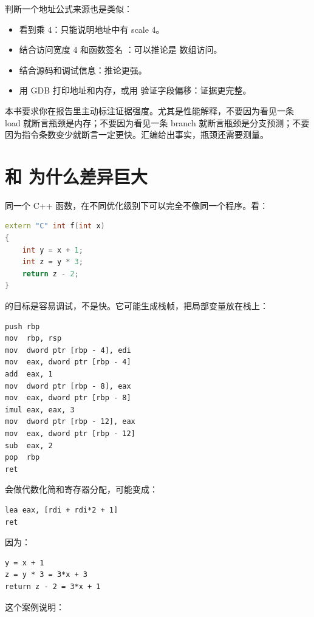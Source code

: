 判断一个地址公式来源也是类似：

\begin{itemize}
  \item 看到乘 4：只能说明地址中有 scale 4。
  \item 结合访问宽度 4 和函数签名 ：可以推论是  数组访问。
  \item 结合源码和调试信息：推论更强。
  \item 用 GDB 打印地址和内存，或用  验证字段偏移：证据更完整。
\end{itemize}

本书要求你在报告里主动标注证据强度。尤其是性能解释，不要因为看见一条 load 就断言瓶颈是内存；不要因为看见一条 branch 就断言瓶颈是分支预测；不要因为指令条数变少就断言一定更快。汇编给出事实，瓶颈还需要测量。

\section{ 和  为什么差异巨大}

同一个 C++ 函数，在不同优化级别下可以完全不像同一个程序。看：

\begin{lstlisting}[language=C++]
extern "C" int f(int x)
{
    int y = x + 1;
    int z = y * 3;
    return z - 2;
}
\end{lstlisting}

 的目标是容易调试，不是快。它可能生成栈帧，把局部变量放在栈上：

\begin{lstlisting}
push rbp
mov  rbp, rsp
mov  dword ptr [rbp - 4], edi
mov  eax, dword ptr [rbp - 4]
add  eax, 1
mov  dword ptr [rbp - 8], eax
mov  eax, dword ptr [rbp - 8]
imul eax, eax, 3
mov  dword ptr [rbp - 12], eax
mov  eax, dword ptr [rbp - 12]
sub  eax, 2
pop  rbp
ret
\end{lstlisting}

 会做代数化简和寄存器分配，可能变成：

\begin{lstlisting}
lea eax, [rdi + rdi*2 + 1]
ret
\end{lstlisting}

因为：

\begin{lstlisting}
y = x + 1
z = y * 3 = 3*x + 3
return z - 2 = 3*x + 1
\end{lstlisting}

这个案例说明：

